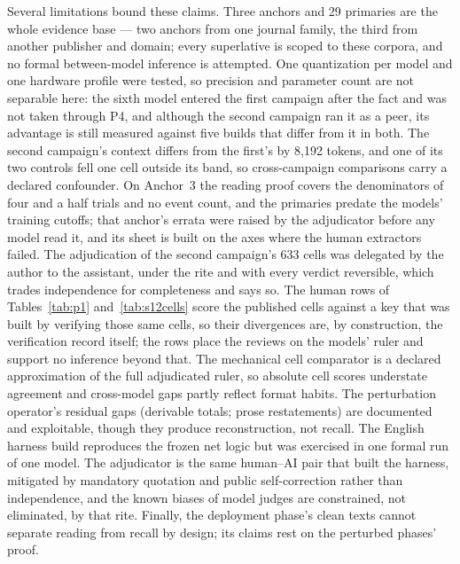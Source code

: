 \documentclass[11pt]{article}
\begin{document}
Several limitations bound these claims. Three anchors and 29 primaries are the whole evidence base --- two anchors from one journal family, the third from another publisher and domain; every superlative is scoped to these corpora, and no formal between-model inference is attempted. One quantization per model and one hardware profile were tested, so precision and parameter count are not separable here: the sixth model entered the first campaign after the fact and was not taken through P4, and although the second campaign ran it as a peer, its advantage is still measured against five builds that differ from it in both. The second campaign's context differs from the first's by 8{,}192 tokens, and one of its two controls fell one cell outside its band, so cross-campaign comparisons carry a declared confounder. On Anchor~3 the reading proof covers the denominators of four and a half trials and no event count, and the primaries predate the models' training cutoffs; that anchor's errata were raised by the adjudicator before any model read it, and its sheet is built on the axes where the human extractors failed. The adjudication of the second campaign's 633 cells was delegated by the author to the assistant, under the rite and with every verdict reversible, which trades independence for completeness and says so. The human rows of Tables~\ref{tab:p1} and~\ref{tab:s12cells} score the published cells against a key that was built by verifying those same cells, so their divergences are, by construction, the verification record itself; the rows place the reviews on the models' ruler and support no inference beyond that. The mechanical cell comparator is a declared approximation of the full adjudicated ruler, so absolute cell scores understate agreement and cross-model gaps partly reflect format habits. The perturbation operator's residual gaps (derivable totals; prose restatements) are documented and exploitable, though they produce reconstruction, not recall. The English harness build reproduces the frozen net logic but was exercised in one formal run of one model. The adjudicator is the same human--AI pair that built the harness, mitigated by mandatory quotation and public self-correction rather than independence, and the known biases of model judges \citep{zheng2023judging} are constrained, not eliminated, by that rite. Finally, the deployment phase's clean texts cannot separate reading from recall by design; its claims rest on the perturbed phases' proof.
\end{document}
